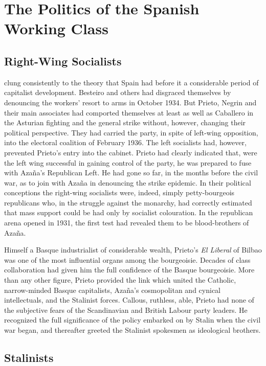 \chapter{The Politics of the Spanish Working Class}

\section{Right-Wing Socialists}

 clung consistently to the theory that Spain had before it a considerable period of capitalist development. Besteiro and others had disgraced themselves by denouncing the workers’ resort to arms in October 1934. But Prieto, Negrin and their main associates had comported themselves at least as well as Caballero in the Asturian fighting and the general strike without, however, changing their political perspective. They had carried the party, in spite of left-wing opposition, into the electoral coalition of February 1936. The left socialists had, however, prevented Prieto’s entry into the cabinet. Prieto had clearly indicated that, were the left wing successful in gaining control of the party, he was prepared to fuse with Azaña’s Republican Left. He had gone so far, in the months before the civil war, as to join with Azaña in denouncing the strike epidemic. In their political conceptions the right-wing socialists were, indeed, simply petty-bourgeois republicans who, in the struggle against the monarchy, had correctly estimated that mass support could be had only by socialist colouration. In the republican arena opened in 1931, the first test had revealed them to be blood-brothers of Azaña.

Himself a Basque industrialist of considerable wealth, Prieto’s \emph{El Liberal} of Bilbao was one of the most influential organs among the bourgeoisie. Decades of class collaboration had given him the full confidence of the Basque bourgeoisie. More than any other figure, Prieto provided the link which united the Catholic, narrow-minded Basque capitalists, Azaña’s cosmopolitan and cynical intellectuals, and the Stalinist forces. Callous, ruthless, able, Prieto had none of the subjective fears of the Scandinavian and British Labour party leaders. He recognized the full significance of the policy embarked on by Stalin when the civil war began, and thereafter greeted the Stalinist spokesmen as ideological brothers.

\section{Stalinists}

